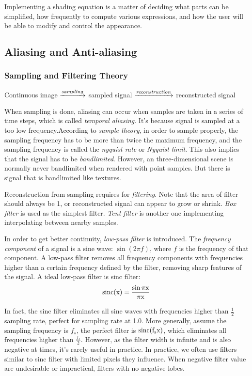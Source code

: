 \documentclass[10pt, a4paper]{article}
\begin{document}
            Implementing a shading equation is a matter of deciding what parts can be simplified, how frequently to compute various expressions, and how the user will be able to modify and control the appearance.
            \newpage
         
        \subsection{Aliasing and Anti-aliasing}            \subsubsection{Sampling and Filtering Theory}
                {\footnotesize{Continuous image}} $\xrightarrow{\emph{sampling}}$ {\footnotesize{sampled signal}} $\xrightarrow{\emph{reconstruction}}$ {\footnotesize{reconstructed signal}}
            \newline

            When sampling is done, aliasing can occur when samples are taken in a series of time steps, which is called \emph{temporal aliasing}. It's because signal is sampled at a too low frequency.According to \emph{sample theory}, in order to sample properly, the sampling frequency has to be more than twice the maximum frequency, and the sampling frequency is called the \emph{nyquist rate} or \emph{Nyquist limit}. This also implies that the signal has to be \emph{bandlimited}. However, an three-dimensional scene is normally never bandlimited when rendered with point samples. But there is signal that is bandlimited like textures.

            Reconstruction from sampling requires for \emph{filtering}. Note that the area of filter should always be 1, or reconstructed signal can appear to grow or shrink. \emph{Box filter} is used as the simplest filter. \emph{Tent filter} is another one implementing interpolating between nearby samples. 
            
            In order to get better continuity, \emph{low-pass filter} is introduced. The \emph{frequency component} of a signal is a sine wave: $\sin{(2\pi f)}$, where $f$ is the frequency of that component. A low-pass filter removes all frequency components with frequencies higher than a certain frequency defined by the filter, removing sharp features of the signal. A ideal low-pass filter is sinc filter:
                $$\rm{sinc}(x) = \frac{\sin{\pi x}}{\pi x}$$
            
            In fact, the sinc filter eliminates all sine waves with frequencies higher than $\frac{1}{2}$ sampling rate, perfect for sampling rate at 1.0. More generally, assume the sampling frequency is $f_s$, the perfect filter is $\rm{sinc}(f_s x)$, which eliminates all frequencies  higher than $\frac{f_s}{2}$. However, as the filter width is infinite and is also negative at times, it's rarely useful in practice. In practice, we often use filters similar to sinc filter with limited pixels they influence. When negative filter value are undesirable or impractical, filters with no negative lobes.
\end{document}
